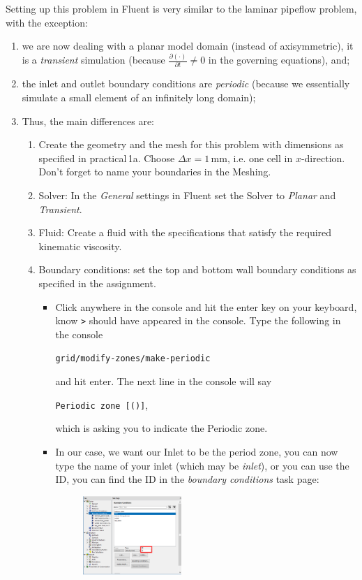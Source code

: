 \documentclass[11pt,a4paper,oneside,hidelinks]{scrartcl}
\begin{document}
Setting up this problem in Fluent is very similar to the laminar pipeflow problem, with the exception:
\begin{enumerate}
   \item  we are now dealing with a planar model domain (instead of axisymmetric), it is a \emph{transient} simulation (because $\frac{\partial\left(\cdot\right)}{\partial t}\neq0$ in the governing equations), and;
   \item the inlet and outlet boundary conditions are \emph{periodic} (because we essentially simulate a small element of an infinitely long domain);
   \item Thus, the main differences are:

\begin{enumerate}
\item Create the geometry and the mesh for this problem with dimensions as specified in practical\,1a. Choose $\Delta x =1$\,mm, i.e. one cell in $x$-direction. Don't forget to name your boundaries in the Meshing.
\item Solver: In the \emph{General} settings in Fluent set the Solver to \emph{Planar} and \emph{Transient}.
\item Fluid: Create a fluid with the specifications that satisfy the required kinematic viscosity.
\item Boundary conditions: set the top and bottom wall boundary conditions as specified in the assignment. 
    \begin{itemize}
       \item Click anywhere in the console and hit the enter key on your keyboard, know \texttt{>} should have appeared in the console. Type the following in the console 
       \begin{center}
            \texttt{grid/modify-zones/make-periodic}
       \end{center}
 and hit enter. The next line in the console will say  
       \begin{center}
            \texttt{Periodic zone [()]},
       \end{center}
which is asking you to indicate the Periodic zone.
       \item In our case, we want our Inlet to be the period zone, you can now type the name of your inlet (which may be \emph{inlet}), or you can use the ID, you can find the ID in the \emph{boundary conditions} task page:
 \begin{figure}[H]
\begin{center}
\includegraphics[width=0.4\textwidth,clip]{BC_ID.png}

\end{center}
\end{figure}
\end{itemize}
\end{enumerate}
\end{enumerate}
\end{document}
